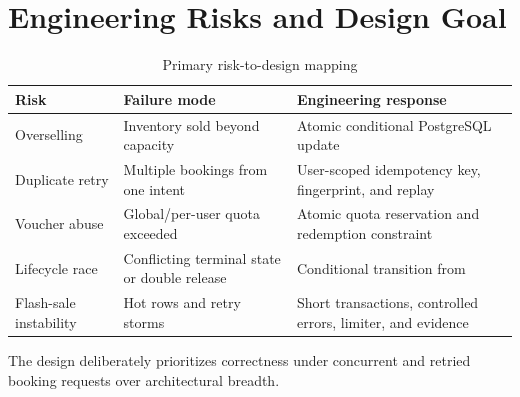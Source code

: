 \section{Engineering Risks and Design Goal}
\begin{table}[H]
\centering
\small
\caption{Primary risk-to-design mapping}
\begin{tabularx}{\textwidth}{p{}p{}Y}
\toprule
\textbf{Risk} & \textbf{Failure mode} & \textbf{Engineering response} \\
\midrule
Overselling & Inventory sold beyond capacity & Atomic conditional PostgreSQL update \\
Duplicate retry & Multiple bookings from one intent & User-scoped idempotency key, fingerprint, and replay \\
Voucher abuse & Global/per-user quota exceeded & Atomic quota reservation and redemption constraint \\
Lifecycle race & Conflicting terminal state or double release & Conditional transition from  \\
Flash-sale instability & Hot rows and retry storms & Short transactions, controlled errors, limiter, and evidence \\
\bottomrule
\end{tabularx}
\end{table}

The design deliberately prioritizes correctness under concurrent and retried
booking requests over architectural breadth.
